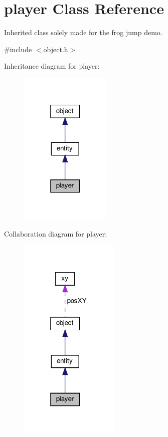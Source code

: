 \hypertarget{classplayer}{}\section{player Class Reference}
\label{classplayer}


Inherited class solely made for the frog jump demo.  




{\ttfamily \#include $<$object.\+h$>$}



Inheritance diagram for player\+:
\nopagebreak
\begin{figure}[H]
\begin{center}
\leavevmode
\includegraphics[width=123pt]{classplayer__inherit__graph}
\end{center}
\end{figure}


Collaboration diagram for player\+:
\nopagebreak
\begin{figure}[H]
\begin{center}
\leavevmode
\includegraphics[width=135pt]{classplayer__coll__graph}
\end{center}
\end{figure}
